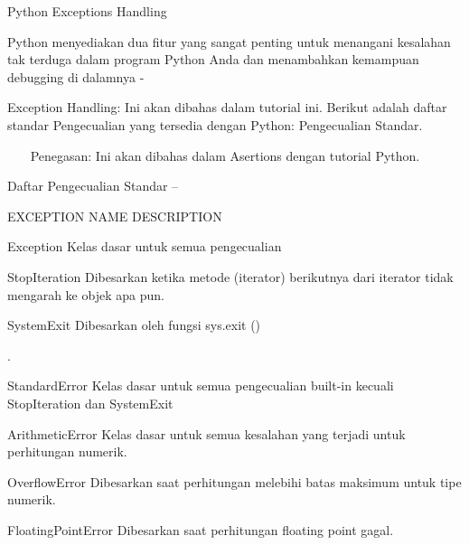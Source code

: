 
\begin{center}{\fontsize{14pt}{14pt}\selectfont Python Exceptions Handling \\}\end{center} \par
Python menyediakan dua fitur yang sangat penting untuk menangani kesalahan tak terduga dalam program Python Anda dan menambahkan kemampuan debugging di dalamnya - \par
\vspace{12pt}
 Exception Handling: Ini akan dibahas dalam tutorial ini. Berikut adalah daftar standar Pengecualian yang tersedia dengan Python: Pengecualian Standar. \par
\vspace{12pt}
~~~ Penegasan: Ini akan dibahas dalam Asertions dengan tutorial Python. \par
\vspace{12pt}
Daftar Pengecualian Standar – \par
\vspace{12pt}
EXCEPTION NAME \hspace*{0.5in} DESCRIPTION \par
Exception \hspace*{0.5in} Kelas dasar untuk semua pengecualian \par
\vspace{12pt}
StopIteration \hspace*{0.5in} Dibesarkan ketika metode (iterator) berikutnya dari iterator tidak mengarah ke objek apa pun. \par
\vspace{12pt}
SystemExit \hspace*{0.5in} Dibesarkan oleh fungsi sys.exit () \par
. \par
StandardError \hspace*{0.5in} Kelas dasar untuk semua pengecualian built-in kecuali StopIteration dan SystemExit \par
\vspace{12pt}
ArithmeticError \hspace*{0.5in} Kelas dasar untuk semua kesalahan yang terjadi untuk perhitungan numerik. \par
\vspace{12pt}
OverflowError \hspace*{0.5in} Dibesarkan saat perhitungan melebihi batas maksimum untuk tipe numerik. \par
\vspace{12pt}
FloatingPointError \hspace*{0.5in} Dibesarkan saat perhitungan floating point gagal. \par
